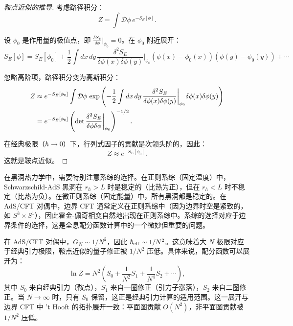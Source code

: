 \begin{proof}[鞍点近似的推导]
考虑路径积分：
\begin{equation}
    Z = \int \mathcal{D}\phi \, e^{-S_E[\phi]}.
\end{equation}

设 $\phi_0$ 是作用量的极值点，即 $\frac{\delta S_E}{\delta \phi}\bigg|_{\phi_0} = 0$。在 $\phi_0$ 附近展开：
\begin{equation}
    S_E[\phi] = S_E[\phi_0] + \frac{1}{2} \int dx \, dy \, \frac{\delta^2 S_E}{\delta\phi(x)\delta\phi(y)}\bigg|_{\phi_0} (\phi(x) - \phi_0(x))(\phi(y) - \phi_0(y)) + \cdots
\end{equation}

忽略高阶项，路径积分变为高斯积分：
\begin{align}
    Z &\approx e^{-S_E[\phi_0]} \int \mathcal{D}\phi \, \exp\left(-\frac{1}{2} \int dx \, dy \, \frac{\delta^2 S_E}{\delta\phi(x)\delta\phi(y)}\bigg|_{\phi_0} \delta\phi(x)\delta\phi(y)\right) \notag \\
    &= e^{-S_E[\phi_0]} \left(\det \frac{\delta^2 S_E}{\delta\phi\delta\phi}\bigg|_{\phi_0}\right)^{-1/2}.
\end{align}

在经典极限（$\hbar \to 0$）下，行列式因子的贡献是次领头阶的，因此：
\begin{equation}
    Z \approx e^{-S_E[\phi_0]}.
\end{equation}
这就是鞍点近似。
\end{proof}

\begin{note}[系综等价性与黑洞稳定性]
在黑洞热力学中，需要特别注意系综的选择。在正则系综（固定温度）中，Schwarzschild-AdS 黑洞在 $r_h > L$ 时是稳定的（比热为正），但在 $r_h < L$ 时不稳定（比热为负）。在微正则系综（固定能量）中，所有黑洞都是稳定的。在 AdS/CFT 对偶中，边界 CFT 通常定义在正则系综中（因为边界时空是紧致的，如 $S^3 \times S^1$），因此霍金-佩奇相变\cite{Hawking1983}自然地出现在正则系综中。系综的选择对应于边界条件的选择，这是全息配分函数计算中的一个微妙但重要的问题\cite{Skenderis2002}。
\end{note}

\begin{note}[大 $N$ 极限与鞍点近似的精度]
在 AdS/CFT 对偶中，$G_N \sim 1/N^2$，因此 $\hbar_{\rm eff} \sim 1/N^2$。这意味着大 $N$ 极限对应于经典引力极限，鞍点近似的量子修正被 $1/N^2$ 压低。具体来说，配分函数可以展开为：
\begin{equation}
    \ln Z = N^2 \left( S_0 + \frac{1}{N^2} S_1 + \frac{1}{N^4} S_2 + \cdots \right),
\end{equation}
其中 $S_0$ 来自经典引力（鞍点），$S_1$ 来自一圈修正（引力子涨落），$S_2$ 来自二圈修正。当 $N \to \infty$ 时，只有 $S_0$ 保留，这正是经典引力计算的适用范围。这一展开与边界 CFT 中 't Hooft 的拓扑展开一致：平面图贡献 $O(N^2)$，非平面图贡献被 $1/N^2$ 压低\cite{Aharony1999}。
\end{note}

